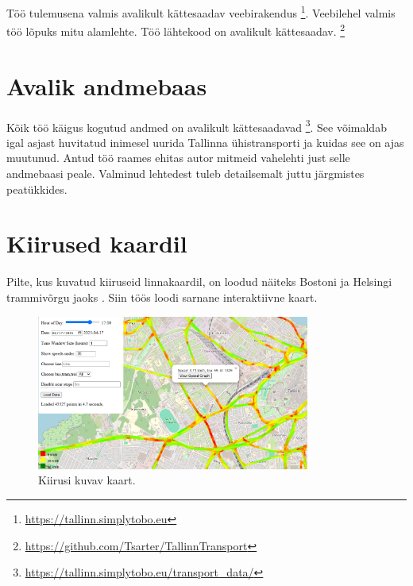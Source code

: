 Töö tulemusena valmis avalikult kättesaadav veebirakendus \footnote{\url{https://tallinn.simplytobo.eu}}. Veebilehel valmis töö lõpuks mitu alamlehte. Töö lähtekood on avalikult kättesaadav. \footnote{\url{https://github.com/Tsarter/TallinnTransport}}

\section{Avalik andmebaas}

Kõik töö käigus kogutud andmed on avalikult kättesaadavad \footnote{\url{https://tallinn.simplytobo.eu/transport_data/}}. See võimaldab igal asjast huvitatud inimesel uurida Tallinna ühistransporti ja kuidas see on ajas muutunud. Antud töö raames ehitas autor mitmeid vahelehti just selle andmebaasi peale. Valminud lehtedest tuleb detailsemalt juttu järgmistes peatükkides. 

\section{Kiirused kaardil}\label{section:Kiirused-kaardil}

Pilte, kus kuvatud kiiruseid linnakaardil, on loodud näiteks Bostoni \cite{boston_woodruff_mbta_2011} ja Helsingi trammivõrgu jaoks \cite{jlf_tram_speeds}. Siin töös loodi sarnane interaktiivne kaart.

\begin{figure}[h!]
    \centering
    \includegraphics[width=0.8\textwidth]{figures/speedSegmentMap2.png}
    \caption{Kiirusi kuvav kaart. }
    \label{fig:Kiirustekaart}
\end{figure}

